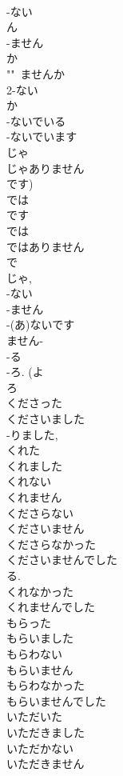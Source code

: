 \documentclass[8pt]{extreport}
\begin{document}
\begin{CJK}{UTF8}{min}
\\	-ない 
\\	ん	
\\	-ません 
\\	か		
\\	""~ませんか
\\	2-ない 
\\	か	
\\	-ないでいる 
\\	-ないでいます		
\\	じゃ 
\\	じゃありません 
\\	です) 
\\	では	
\\	です 
\\	では 
\\	ではありません 
\\	で 
\\	じゃ, 
\\	-ない 
\\	-ません 
\\	-(あ)ないです
\\	ません-
\\	-る 
\\	-ろ. (よ 
\\	ろ 
\\	くださった 
\\	くださいました 
\\	-りました, 
\\	くれた 
\\	くれました	
\\	くれない 
\\	くれません	
\\	くださらない 
\\	くださいません	
\\	くださらなかった 
\\	くださいませんでした 
\\	る. 
\\	くれなかった 
\\	くれませんでした	
\\	もらった 
\\	もらいました	
\\	もらわない 
\\	もらいません	
\\	もらわなかった 
\\	もらいませんでした	
\\	いただいた 
\\	いただきました	
\\	いただかない 
\\	いただきません	

\end{CJK}
\end{document}
